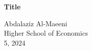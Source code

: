 \begin{titlepage}
  \begin{center}
    \vspace*{1in}
    \Huge{\textbf{Title}}
    \vspace{1.5in}
    
    \large{Abdalaziz Al-Maeeni}\\
    \large{Higher School of Economics}\\
    \large{5, 2024}
  \end{center}
\end{titlepage}

